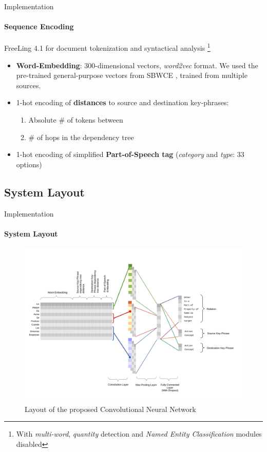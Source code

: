 \documentclass{beamer}
\begin{document}
\begin{frame}{Implementation}
\framesubtitle{Sequence Encoding}


FreeLing 4.1 for document tokenization and syntactical analysis \footnote{With \emph{multi-word}, \emph{quantity} detection and \emph{Named Entity Classification} modules disabled}
\begin{itemize}
\item \textbf{Word-Embedding}: 300-dimensional vectors, \emph{word2vec} format. We used the pre-trained general-purpose vectors from SBWCE \cite{cardellinoSBWCE}, trained from multiple sources.
\item 1-hot encoding of \textbf{distances} to source and destination key-phrases:
\begin{enumerate}
  \item Absolute \# of tokens between
  \item \# of hops in the dependency tree
\end{enumerate}
\item 1-hot encoding of simplified \textbf{Part-of-Speech tag} (\emph{category} and \emph{type}: 33 options)
\end{itemize}

\end{frame}


\subsection{System Layout}

\begin{frame}{Implementation}
	\framesubtitle{System Layout}
    \begin{figure}[ht]
    \centering
    \includegraphics[width=0.9\linewidth,trim={0 1.7cm 0 2.2cm},clip]{diagramtass18.pdf}
    \caption{Layout of the proposed Convolutional Neural Network}
    \label{fig:architecture}
\end{figure}
\end{frame}
\end{document}
